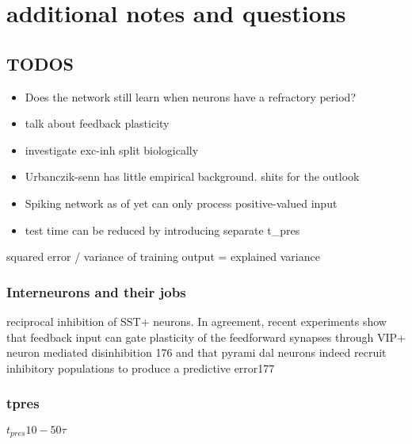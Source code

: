 \chapter{additional notes and questions}

\section{TODOS}

\begin{itemize}
    \item Does the network still learn when neurons have a refractory period?
    \item talk about feedback plasticity
    \item investigate exc-inh split biologically
    \item Urbanczik-senn has little empirical background. shits for the outlook
    \item Spiking network as of yet can only process positive-valued input
    \item test time can be reduced by introducing separate t\_pres
\end{itemize}

squared error / variance of training output = explained variance

\subsection{Interneurons and their jobs}




reciprocal inhibition of SST+ neurons. In agreement, recent experiments show that feedback input can gate plasticity of
the feedforward synapses through VIP+ neuron mediated disinhibition 176 and that pyrami dal neurons indeed recruit
inhibitory populations to produce a predictive error177 \citep{Poirazi2020}

\subsection{tpres}

$t_{pres} 10 - 50 \tau$
